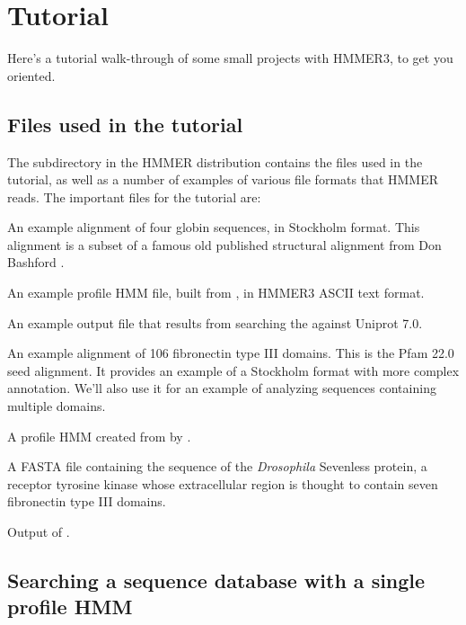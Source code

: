 
\section{Tutorial}
\label{section:tutorial}

Here's a tutorial walk-through of some small projects with HMMER3, to
get you oriented.

\subsection{Files used in the tutorial}

The subdirectory  in the HMMER distribution contains the
files used in the tutorial, as well as a number of examples of various
file formats that HMMER reads. The important files for the tutorial
are:


\begin{wideitem}
\item[\emprog{globins4.sto}] An example alignment of four globin sequences, in
  Stockholm format. This alignment is a subset of a famous old
  published structural alignment from Don Bashford \citep{Bashford87}.
%
\item[\emprog{globins4.hmm}] An example profile HMM file, built from
  , in HMMER3 ASCII text format.
%
\item[\emprog{globins4.out}] An example  output file that results
  from searching the  against Uniprot 7.0.
%
\item[\emprog{fn3.sto}] An example alignment of 106 fibronectin type III
  domains. This is the Pfam 22.0  seed alignment. It provides an
  example of a Stockholm format with more complex annotation. We'll also use
  it for an example of  analyzing sequences containing multiple
  domains.
%
\item[\emprog{fn3.hmm}] A profile HMM created from  by
  .
%
\item[\emprog{7LESS\_DROME}] A FASTA file containing the sequence of
  the \emph{Drosophila} Sevenless protein, a receptor tyrosine kinase
  whose extracellular region is thought to contain seven fibronectin
  type III domains. 
%
\item[\emprog{fn3.out}] Output of .
\end{wideitem}



\subsection{Searching a sequence database with a single profile HMM}

